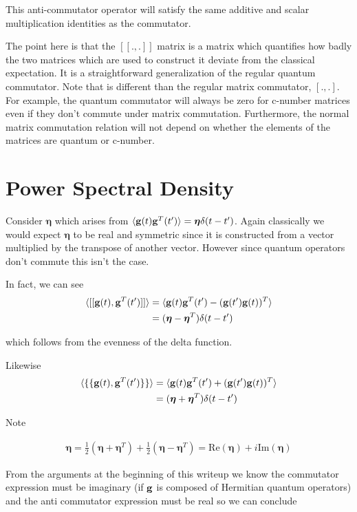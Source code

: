 \documentclass[12pt]{article}
\newcommand{\bv}[1]{\bold{#1}}
\newcommand{\bvs}[1]{\boldsymbol{#1}}
\begin{document}
This anti-commutator operator will satisfy the same additive and scalar multiplication identities as the commutator.

The point here is that the $[[.,.]]$ matrix is a matrix which quantifies how badly the two matrices which are used to construct it deviate from the classical expectation. It is a straightforward generalization of the regular quantum commutator. Note that is different than the regular matrix commutator, $[.,.]$. For example, the quantum commutator will always be zero for c-number matrices even if they don't commute under matrix commutation. Furthermore, the normal matrix commutation relation will not depend on whether the elements of the matrices are quantum or c-number.

\section{Power Spectral Density}

Consider $\bvs{\eta}$ which arises from $\braket{\bv{g}(t)\bv{g}^T(t')} = \bvs{\eta}\delta(t-t')$. Again classically we would expect $\bvs{\eta}$ to be real and symmetric since it is constructed from a vector multiplied by the transpose of another vector. However since quantum operators don't commute this isn't the case.

In fact, we can see
\begin{align}
\braket{[[\bv{g}(t),\bv{g}^T(t')]]} &= \braket{\bv{g}(t)\bv{g}^T(t') - (\bv{g}(t')\bv{g}(t))^T}\\
&= (\boldsymbol{\eta} - \boldsymbol{\eta}^T)\delta(t-t')
\end{align}

which follows from the evenness of the delta function.

Likewise
\begin{align}
\braket{\{\{\bv{g}(t),\bv{g}^T(t')\}\}} &= \braket{\bv{g}(t)\bv{g}^T(t') + (\bv{g}(t')\bv{g}(t))^T}\\
&= (\boldsymbol{\eta} + \boldsymbol{\eta}^T)\delta(t-t')
\end{align}

Note

\begin{align}
\boldsymbol{\eta} = \frac{1}{2}\left(\boldsymbol{\eta} + \boldsymbol{\eta}^T\right) + \frac{1}{2}\left(\boldsymbol{\eta} - \boldsymbol{\eta}^T\right) = \text{Re}(\boldsymbol{\eta}) + i\text{Im}(\boldsymbol{\eta})  
\end{align}

From the arguments at the beginning of this writeup we know the commutator expression must be imaginary (if $\bv{g}$ is composed of Hermitian quantum operators) and the anti commutator expression  must be real so we can conclude
\end{document}
